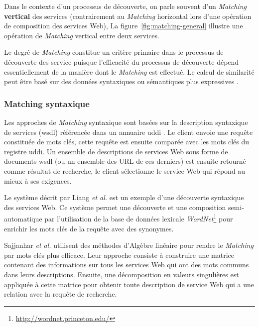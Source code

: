   

  Dans le contexte d'un processus de découverte, on parle souvent d'un
  \textit{Matching} \textbf{vertical} des services (contrairement au
  \textit{Matching} horizontal lors d'une opération de composition des
  services Web), La figure~\ref{fig:matching-general} illustre une
  opération de \textit{Matching} vertical entre deux services.\medskip

  Le degré de \textit{Matching} constitue un critère primaire dans le
  processus de découverte des service puisque l'efficacité du
  processus de découverte dépend essentiellement de la manière dont le
  \textit{Matching} est effectué. Le calcul de similarité peut être
  basé sur des données syntaxiques ou sémantiques plus expressives
  \cite{elie2010}.

    \subsubsection{Matching syntaxique}
    \label{sec:matching-syntaxique}
    Les approches de \textit{Matching} syntaxique sont basées sur la
    description syntaxique de services (\acrshort{wsdl}) référencée
    dans un annuaire \acrshort{uddi} \cite{clement2004uddi}. Le client
    envoie une requête constituée de mots clés, cette requête est
    ensuite comparée avec les mots clés du registre
    \acrshort{uddi}. Un ensemble de descriptions de services Web sous
    forme de documents \acrshort{wsdl} (ou un ensemble des
    \textsc{URL} de ces derniers) est ensuite retourné comme résultat
    de recherche, le client sélectionne le service Web qui répond au
    mieux à ses exigences.\medskip

    Le système décrit par Liang \textit{et al.}
    \cite{DBLP:journals/jwsr/LiangCSCL04} est un exemple d'une
    découverte syntaxique des services Web. Ce système permet une
    découverte et une composition semi-automatique par l'utilisation
    de la base de données lexicale
    \textit{WordNet}\footnote{\url{http://wordnet.princeton.edu/}}
    \cite{miller1990introduction} pour enrichir les mots clés de la
    requête avec des synonymes.\medskip

    Sajjanhar \textit{et al.} \cite{sajjanhar2004algorithm} utilisent
    des méthodes d'Algèbre linéaire pour rendre le \textit{Matching}
    par mots clés plus efficace. Leur approche consiste à construire
    une matrice contenant des informations sur tous les services Web
    qui ont des mots communs dans leurs descriptions. Ensuite, une
    décomposition en valeurs singulières est appliquée à cette matrice
    pour obtenir toute description de service Web qui a une relation
    avec la requête de recherche.\medskip

